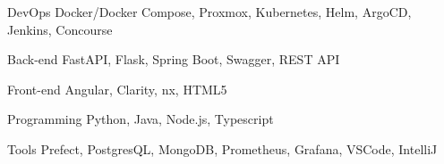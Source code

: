 

\begin{cvskills}

  \cvskill
    {DevOps} %
    {Docker/Docker Compose, Proxmox, Kubernetes, Helm, ArgoCD, Jenkins, Concourse} %

  \cvskill
    {Back-end} %
    {FastAPI, Flask, Spring Boot, Swagger, REST API} %

  \cvskill
    {Front-end} %
    {Angular, Clarity, nx, HTML5} %

  \cvskill
    {Programming} %
    {Python, Java, Node.js, Typescript} %
    
  \cvskill
    {Tools} %
    {Prefect, PostgresQL, MongoDB, Prometheus, Grafana, VSCode, IntelliJ} %

\end{cvskills}